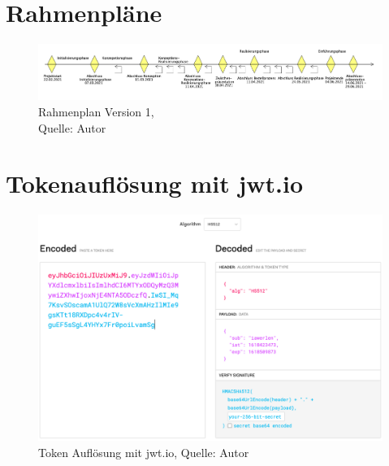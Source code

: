 \section{Rahmenpläne}\label{Rahmenplaene}
\begin{figure}[H]
    \centering
   \includegraphics[width=1\textwidth]{images/SoDa_Zeitstrahl_v1.png}
    \caption[SoDa Rahmenplan Version 1]{Rahmenplan Version 1,\\ Quelle: Autor}
    \label{img: SoDa Rahmenplan_v1}
\end{figure}
\section{Tokenauflösung mit jwt.io}\label{tokenaufloesung}
\begin{figure}[H]
	\centering
	\includegraphics[scale=0.4]{images/jwtIO.PNG}
	\caption[Token Auflösung mit jwt.io]{Token Auflösung mit jwt.io, Quelle: Autor}
	\label{img: jwtio}
\end{figure} 
